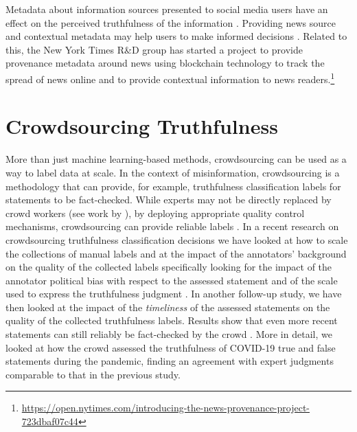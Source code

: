 \documentclass[11pt]{article}
\newcommand{\sm}[1]{\textcolor{red}{[{\bf SM: #1}]}}
\newcommand{\gd}[1]{\textcolor{ForestGreen}{[GD: #1]}}%
\newcommand{\covid}{COVID-19\xspace}
\begin{document}
Metadata about  information sources presented to social media users have an effect on the perceived truthfulness of the information \cite{oeldorf2020posted}. Providing news source and contextual metadata may help users to make informed decisions \cite{evans2020news}. Related to this, the New York Times R\&D group has started a project to provide provenance metadata around news using blockchain technology to track the spread of news online and to provide contextual information to news readers.\footnote{\url{https://open.nytimes.com/introducing-the-news-provenance-project-723dbaf07c44}}

\section{Crowdsourcing Truthfulness}
\label{sec:crowdsourcing}
More than just machine learning-based methods, crowdsourcing can be used as a way to label data at scale. In the context of misinformation, crowdsourcing is a methodology that can provide, for example, truthfulness classification labels for statements to be fact-checked.
While experts may not be directly replaced by crowd workers (see work by \citet{bailey2008relevance}), by deploying appropriate quality control mechanisms, crowdsourcing can provide reliable labels \cite{demartini2017introduction}.
In a recent research on crowdsourcing truthfulness classification decisions we have looked at how to scale the collections of manual labels and at the impact of the annotators' background on the quality of the collected labels specifically looking for the impact of the annotator political bias with respect to the assessed statement and of the scale used to express the truthfulness judgment \cite{roitero2020can}.
% 
In another follow-up study, we have then looked at the impact of the \textit{timeliness} of the assessed statements on the quality of the collected truthfulness labels. Results show that even more recent statements can still reliably be fact-checked by the crowd \cite{roitero2020covid}. More in detail, we looked at how the crowd assessed the truthfulness of \covid true and false statements during the pandemic, finding an agreement with expert judgments comparable to that in the previous study. 
\end{document}
